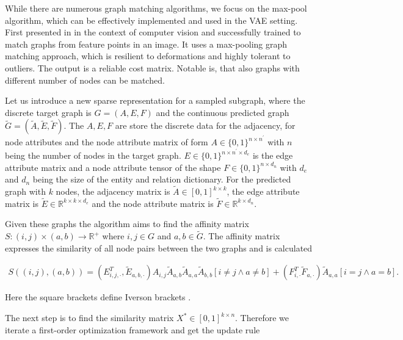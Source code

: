 {While there are numerous graph matching algorithms, we focus on the max-pool algorithm, which can be effectively implemented and used in the VAE setting. First presented in \cite{cho_finding_2014} in the context of computer vision and successfully trained to match graphs from feature points in an image. It uses a max-pooling graph matching approach, which is resilient to deformations and highly tolerant to outliers. The output is a reliable cost matrix. Notable is, that also graphs with different number of nodes can be matched.


Let us introduce a new sparse representation for a sampled subgraph, where the discrete target graph is $G=(A, E, F)$ and the continuous predicted graph $\widetilde{G}=(\widetilde{A}, \widetilde{E}, \widetilde{F})$. The $A, E, F$ are store the discrete data for the adjacency, for node attributes and the node attribute matrix of form $A \in\{0,1\}^{n \times n^{\prime}}$ with $n$ being the number of nodes in the target graph. $E\in\{0,1\}^{n \times n^{\prime} \times d_e}$ is the edge attribute matrix and a node attribute tensor of the shape $F\in\{0,1\}^{n \times d_n}$ with $d_e$ and $d_n$ being the size of the entity and relation dictionary. For the predicted graph with $k$ nodes, the adjacency matrix is $\widetilde{A} \in[0,1]^{k \times k}$, the edge attribute matrix is $\widetilde{E} \in \mathbb{R}^{k \times k \times d_{e}}$ and the node attribute matrix is $\widetilde{F} \in \mathbb{R}^{k \times d_{n}}$.


Given these graphs the algorithm aims to find the affinity matrix $S:(i, j) \times(a, b) \rightarrow \mathbb{R}^{+}$ where $i, j \in G$ and $a, b \in \widetilde{G}$. The affinity matrix expresses the similarity of all node pairs between the two graphs and is calculated 

\begin{equation}
    \begin{array}{l}
        S((i, j),(a, b)) = \left(E_{i, j, \cdot}^{T}, \widetilde{E}_{a, b, \cdot}\right) A_{i, j} \widetilde{A}_{a, b} \widetilde{A}_{a, a} \widetilde{A}_{b, b}[i \neq j \wedge a \neq b] + \left(F_{i, \cdot}^{T} \widetilde{F}_{a, \cdot}\right) \widetilde{A}_{a, a}[i=j \wedge a=b].
    \end{array}
\label{eq3:s}
\end{equation}

Here the square brackets define Iverson brackets \cite{simonovsky_graphvae_2018}.


The next step is to find the similarity matrix $X^* \in[0,1]^{k \times n}$. Therefore we iterate a first-order optimization framework and get the update rule

}
